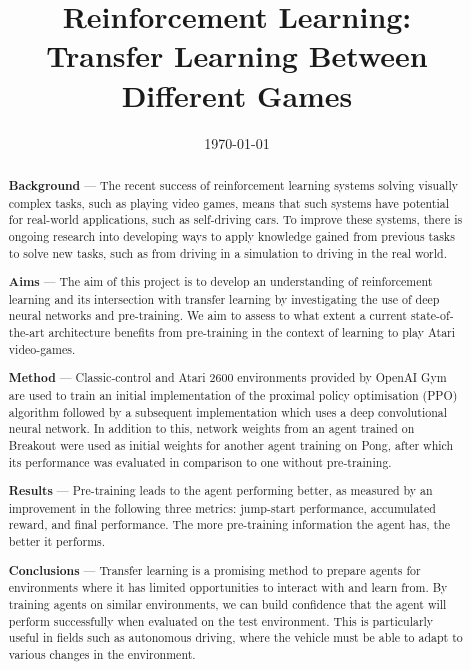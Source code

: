 \documentclass[12pt,a4paper]{article}
\title{Reinforcement Learning: \\Transfer Learning Between Different Games}
\author{} %
\date{\today}
\begin{document}
\maketitle

\begin{abstract}

\begin{flushleft} 
{\bf Background} --- The recent success of reinforcement learning systems solving visually complex tasks, such as playing video games, means that such systems have potential for real-world applications, such as self-driving cars. To improve these systems, there is ongoing research into developing ways to apply knowledge gained from previous tasks to solve new tasks, such as from driving in a simulation to driving in the real world.
\end{flushleft}

\begin{flushleft}
{\bf Aims} --- The aim of this project is to develop an understanding of reinforcement learning and its intersection with transfer learning by investigating the use of deep neural networks and pre-training. We aim to assess to what extent a current state-of-the-art architecture benefits from pre-training in the context of learning to play Atari video-games.
\end{flushleft}

\begin{flushleft}
{\bf Method} --- Classic-control and Atari 2600 environments provided by OpenAI Gym are used to train an initial implementation of the proximal policy optimisation (PPO) algorithm followed by a subsequent implementation which uses a deep convolutional neural network. In addition to this, network weights from an agent trained on Breakout were used as initial weights for another agent training on Pong, after which its performance was evaluated in comparison to one without pre-training. 
\end{flushleft}

\begin{flushleft}
{\bf Results} --- Pre-training leads to the agent performing better, as measured by an improvement in the following three metrics: jump-start performance, accumulated reward, and final performance. The more pre-training information the agent has, the better it performs. 
\end{flushleft}

\begin{flushleft}
{\bf Conclusions} --- Transfer learning is a promising method to prepare agents for environments where it has limited opportunities to interact with and learn from. By training agents on similar environments, we can build confidence that the agent will perform successfully when evaluated on the test environment. This is particularly useful in fields such as autonomous driving, where the vehicle must be able to adapt to various changes in the environment.
\end{flushleft}

\end{abstract}
\end{document}
